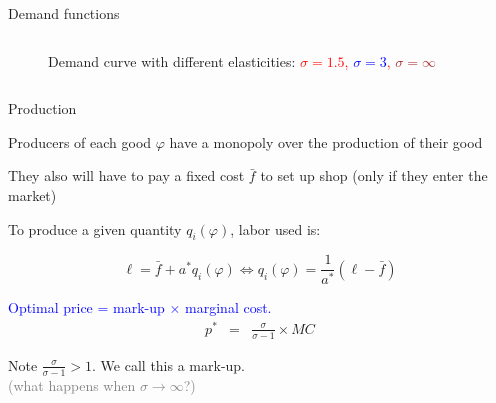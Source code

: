 \documentclass[notes,11pt, aspectratio=169, xcolor=table]{beamer}
\newcommand{\blue}[1]{\textcolor{blue}{#1}}
\newenvironment{wideitemize}{\itemize\addtolength{\itemsep}{10pt}}{\enditemize}
\begin{document}
\begin{frame}{Demand functions}
\begin{columns}
\begin{column}{0.5\textwidth}
{\begin{figure}[htp]
            \caption{Demand curve with different elasticities: \textcolor{red}{$\sigma=1.5$, \textcolor{blue}{$\sigma=3$}, \textcolor{brown}{$\sigma=\infty$}}}
        \label{fig: ces-demand}
    \end{figure}
    
        }

            \end{column}
\end{columns}
\end{frame}

\begin{frame}{Production}

\begin{wideitemize}
    \item Producers of each good $\varphi$ have a monopoly over the production of their good
    \item They also will have to pay a fixed cost $\bar{f}$ to set up shop (only if they enter the market)

    \item To produce a given quantity $q_i(\varphi)$, labor used is:

    \begin{equation*}
         \ell = \bar{f} + a^*q_i(\varphi) \iff q_i(\varphi) = \frac{1}{a^*} (\ell - \bar{f})
    \end{equation*}

    \item \blue{Optimal price = mark-up $\times$ marginal cost.}
    \begin{eqnarray*}
        p^* &=& \frac{\sigma}{\sigma -1}\times MC 
    \end{eqnarray*}

    \item Note $\frac{\sigma}{\sigma -1} > 1$. We call this a mark-up. \\
    \qquad \textcolor{gray}{(what happens when $\sigma \to \infty$?)}
    \end{wideitemize}
    
\end{frame}
\end{document}
